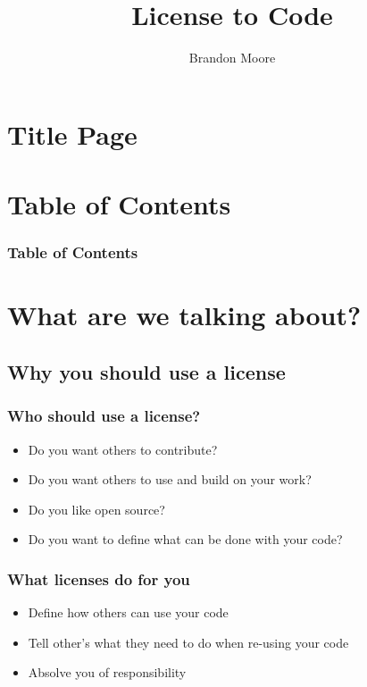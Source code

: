 \documentclass{beamer}
\begin{document}
	\title{License to Code}
	\author{Brandon Moore}
	\date{}
	\section{Title Page}
	\frame{\titlepage}
	\section{Table of Contents}
	\begin{frame}
		\frametitle{Table of Contents}
		\tableofcontents[]
	\end{frame}
	\section{What are we talking about?}
	\subsection{Why you should use a license}
	\begin{frame}
		\frametitle{Who should use a license?}
		\pause
		\begin{itemize}[<+->]
			\item Do you want others to contribute?
			\item Do you want others to use and build on your work?
			\item Do you like open source?
			\item Do you want to define what can be done with your code?
		\end{itemize}
		\pause
		\center{\LARGE\textbf{Use A License!}}
	\end{frame}
	\begin{frame}
		\frametitle{What licenses do for you}
		\pause
		\begin{itemize}[<+->]
			\item Define how others can use your code
			\item Tell other's what they need to do when re-using your code
			\item Absolve you of responsibility
		\end{itemize}
	\end{frame}
\end{document}
